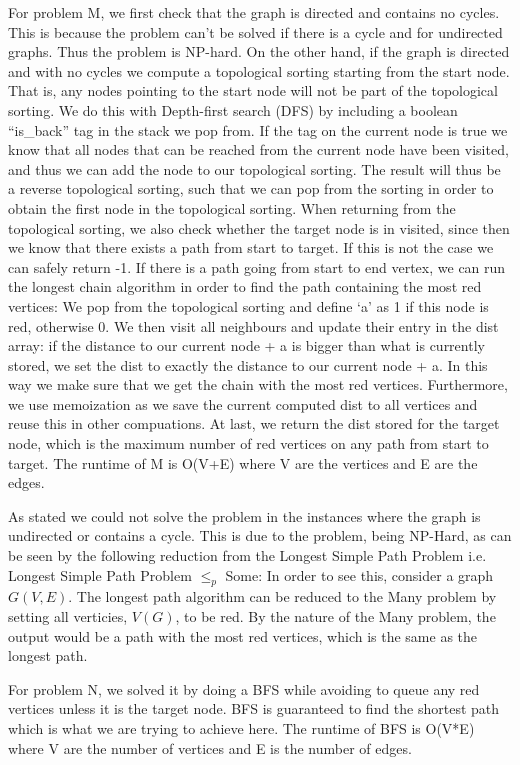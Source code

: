 \documentclass{tufte-handout}
\begin{document}
For problem M, we first check that the graph is directed and contains no cycles. This is because the problem can’t be solved if there is a cycle and for undirected graphs. Thus the problem is NP-hard. On the other hand, if the graph is directed and with no cycles we compute a topological sorting starting from the start node. That is, any nodes pointing to the start node will not
 be part of the topological sorting. We do this with Depth-first search (DFS) by including a boolean “is\_back” tag in the stack we pop from. If the tag on the current node is true we know that all nodes that can be reached from the current node have been visited, and thus we can add the node to our topological sorting. The result will thus be a reverse topological sorting, 
such that we can pop from the sorting in order to obtain the first node in the topological sorting. When returning from the topological sorting, we also check whether the target node is in visited, since then we know that there exists a path from start to target. If this is not the case we can safely return
 -1. If there is a path going from start to end vertex, we can run the longest chain algorithm in order to find the path containing the most red vertices: We pop from the topological sorting and define ‘a’ as 1 if this node is red, otherwise 0. We then visit all neighbours and update their entry in the dist array: if the distance to our current node + a is bigger
 than what is currently stored, we set the dist to exactly the distance to our current node + a. In this way we make sure that we get the chain with the most red vertices. Furthermore, we use memoization as we save the current computed dist to all vertices and reuse this in other compuations. At last, we return the dist stored for the target node, which is the maximum number of red vertices on any path from start to target. The runtime of M is O(V+E) where V are the vertices and E are the edges.
 
As stated we could not solve the problem in the instances where the graph is undirected or contains a cycle. This is due to the problem, being NP-Hard, as can be seen by the following reduction from the Longest Simple Path Problem i.e. Longest Simple Path Problem $\leq_p$ Some: In order to see this, consider a graph $G(V,E)$. The longest path algorithm can be reduced to the Many problem by setting all verticies, $V(G)$, to be red. By the nature of the Many problem, the output would be a path with the most red vertices, which is the same as the longest path. 

For problem N, we solved it by doing a BFS while avoiding to queue any red vertices unless it is the target node. BFS is guaranteed
to find the shortest path which is what we are trying to achieve here.
The runtime of BFS is O(V*E) where V are the number of vertices and E is the number of edges.
\end{document}
